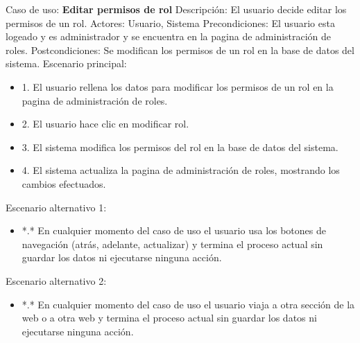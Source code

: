 Caso de uso: \textbf{Editar permisos de rol}
\newline
Descripción: El usuario decide editar los permisos de un rol.
\newline
Actores: Usuario, Sistema
\newline
Precondiciones: El usuario esta logeado y es administrador y se encuentra en la pagina de administración de roles.
\newline
Postcondiciones: Se modifican los permisos de un rol en la base de datos del sistema.
\newline
Escenario principal:
\begin{itemize}
\item 1. El usuario rellena los datos para modificar los permisos de un rol en la pagina de administración de roles.
\item 2. El usuario hace clic en modificar rol.
\item 3. El sistema modifica los permisos del rol en la base de datos del sistema.
\item 4. El sistema actualiza la pagina de administración de roles, mostrando los cambios efectuados.
\end{itemize}
Escenario alternativo 1: 
\begin{itemize}
	\item *.* En cualquier momento del caso de uso el usuario usa los botones de navegación (atrás, adelante, actualizar) y termina el proceso actual sin guardar los datos ni ejecutarse ninguna acción.
\end{itemize}
Escenario alternativo 2:
\begin{itemize}
	\item *.* En cualquier momento del caso de uso el usuario viaja a otra sección de la web o a otra web y termina el proceso actual sin guardar los datos ni ejecutarse ninguna acción.
\end{itemize}

